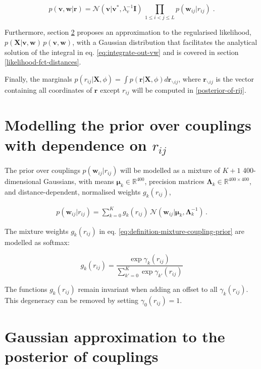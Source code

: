 \documentclass[12pt,a4paper,twoside]{book}
\newcommand{\Gauss}{\mathcal{N}}
\newcommand{\I}{\mathbf{I}}
\newcommand{\Lk}{\mathbf{\Lambda}_k}
\newcommand{\muk}{\mathbf{\mu}_k}
\renewcommand{\r}{\mathbf{r}}
\newcommand{\rij}{r_{ij}}
\renewcommand{\v}{\mathbf{v}}
\newcommand{\w}{\mathbf{w}}
\newcommand{\wij}{\mathbf{w}_{ij}}
\newcommand{\X}{\mathbf{X}}
\theoremstyle{definition}
\theoremstyle{definition}
\theoremstyle{remark}
\begin{document}
\begin{equation}
  p(\v,\w|\r) = \Gauss(\v|\v^*,\lambda_v^{-1} \I) \, \prod_{1\le i<j\le L} p(\wij|\rij) \; .
\label{eq:definition-parameter-prior}
\end{equation}

Furthermore, section \ref{laplace-approx} proposes an approximation to
the regularised likelihood, \(p(\X | \v,\w) \, p(\v, \w)\), with a
Gaussian distribution that facilitates the analytical solution of the
integral in eq. \eqref{eq:integrate-out-vw} and is covered in section
\ref{likelihood-fct-distances}.

Finally, the marginals
\(p(\rij | \X, \phi) = \int p(\r | \X, \phi) d \r_{\backslash ij}\),
where \(\r_{\backslash ij}\) is the vector containing all coordinates of
\(\r\) except \(\rij\) will be computed in \ref{posterior-of-rij}.

\section{\texorpdfstring{Modelling the prior over couplings with
dependence on
\(\rij\)}{Modelling the prior over couplings with dependence on \textbackslash{}rij}}\label{coupling-prior}

The prior over couplings \(p(\wij|\rij)\) will be modelled as a mixture
of \(K\!+\!1\) 400-dimensional Gaussians, with means
\(\muk \in \mathbb{R}^{400}\), precision matrices
\(\Lk \in \mathbb{R}^{400\times 400}\), and distance-dependent,
normalised weights \(g_k(\rij)\),

\begin{align}   
      p(\wij | \rij) = \sum_{k=0}^K g_k(\rij) \, \Gauss(\wij | \muk, \Lk^{-1}) \,.
\label{eq:definition-mixture-coupling-prior}
\end{align}

The mixture weights \(g_k(\rij)\) in eq.
\eqref{eq:definition-mixture-coupling-prior} are modelled as softmax:

\begin{equation}
    g_k(\rij) = \frac{\exp \gamma_k(\rij)}{\sum_{k'=0}^K \exp \gamma_{k'}(\rij)} 
\label{eq:def-g-k-binary}
\end{equation}

The functions \(g_k(\rij)\) remain invariant when adding an offset to
all \(\gamma_k(\rij)\). This degeneracy can be removed by setting
\(\gamma_0(\rij)=1\).

\section{Gaussian approximation to the posterior of
couplings}\label{laplace-approx}
\end{document}
